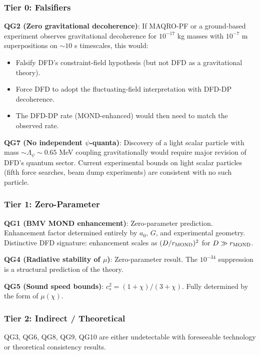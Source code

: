 \documentclass[11pt,a4paper]{article}
\begin{document}
\subsubsection{Tier 0: Falsifiers}

\textbf{QG2 (Zero gravitational decoherence)}: If MAQRO-PF or a ground-based experiment observes gravitational decoherence for $10^{-17}$ kg masses with $10^{-7}$ m superpositions on $\sim 10$ s timescales, this would:
\begin{itemize}
\item Falsify DFD's constraint-field hypothesis (but not DFD as a gravitational theory).
\item Force DFD to adopt the fluctuating-field interpretation with DFD-DP decoherence.
\item The DFD-DP rate (MOND-enhanced) would then need to match the observed rate.
\end{itemize}

\textbf{QG7 (No independent $\psi$-quanta)}: Discovery of a light scalar particle with mass $\sim \Lambda_\psi \sim 0.65$ MeV coupling gravitationally would require major revision of DFD's quantum sector. Current experimental bounds on light scalar particles (fifth force searches, beam dump experiments) are consistent with no such particle.

\subsubsection{Tier 1: Zero-Parameter}

\textbf{QG1 (BMV MOND enhancement)}: Zero-parameter prediction. Enhancement factor determined entirely by $a_0$, $G$, and experimental geometry. Distinctive DFD signature: enhancement scales as $(D/r_{\rm MOND})^2$ for $D \gg r_{\rm MOND}$.

\textbf{QG4 (Radiative stability of $\mu$)}: Zero-parameter result. The $10^{-34}$ suppression is a structural prediction of the theory.

\textbf{QG5 (Sound speed bounds)}: $c_s^2 = (1+\chi)/(3+\chi)$. Fully determined by the form of $\mu(\chi)$.

\subsubsection{Tier 2: Indirect / Theoretical}

QG3, QG6, QG8, QG9, QG10 are either undetectable with foreseeable technology or theoretical consistency results.
\end{document}
